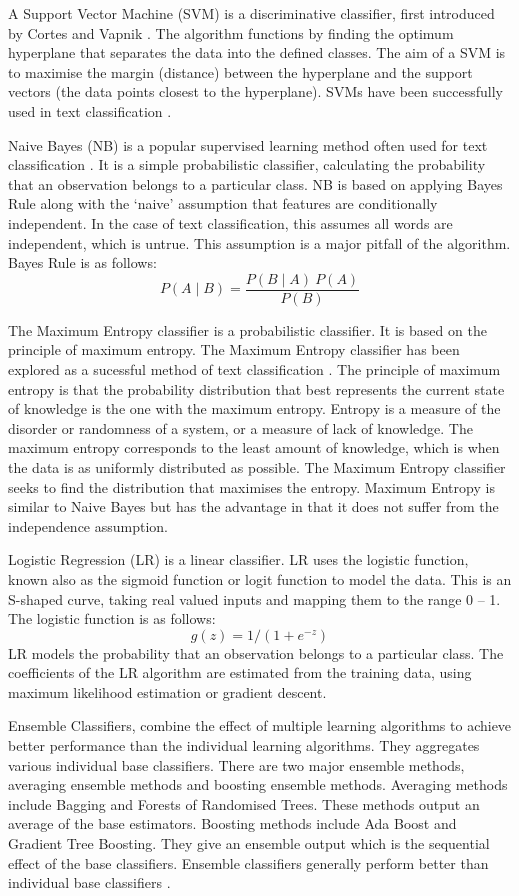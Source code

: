 A Support Vector Machine (SVM) is a discriminative classifier, first introduced by Cortes and Vapnik \cite{Vapnik1995,Vapnik21995}. The algorithm functions by finding the optimum hyperplane that separates the data into the defined classes. The aim of a SVM is to maximise the margin (distance) between the hyperplane and the support vectors (the data points closest to the hyperplane). SVMs have been successfully used in text classification \cite{Joachims1998}.

Naive Bayes (NB) is a popular supervised learning method often used for text classification \cite{NaiveBayes1998}. It is a simple probabilistic classifier, calculating the probability that an observation belongs to a particular class. NB is based on applying Bayes Rule along with the ‘naive’ assumption that features are conditionally independent. In the case of text classification, this assumes all words are independent, which is untrue. This assumption is a major pitfall of the algorithm. Bayes Rule is as follows:  \[P(A\mid B)=\frac{P(B\mid A)\:P(A)}{P(B)}\] 

The Maximum Entropy classifier is a probabilistic classifier. It is based on the principle of maximum entropy. The Maximum Entropy classifier has been explored as a sucessful method of text classification \cite{MaxEnt1999}. The principle of maximum entropy is that the probability distribution that best represents the current state of knowledge is the one with the maximum entropy. Entropy is a measure of the disorder or randomness of a system, or a measure of lack of knowledge. The maximum entropy corresponds to the least amount of knowledge, which is when the data is as uniformly distributed as possible. The Maximum Entropy classifier seeks to find the distribution that maximises the entropy. Maximum Entropy is similar to Naive Bayes but has the advantage in that it does not suffer from the independence assumption.

Logistic Regression (LR) is a linear classifier. LR uses the logistic function, known also as the sigmoid function or logit function to model the data. This is an S-shaped curve, taking real valued inputs and mapping them to the range 0 – 1. The logistic function is as follows: \[g(z)=1/(1+e^{-z})\]
LR models the probability that an observation belongs to a particular class. The coefficients of the LR algorithm are estimated from the training data, using maximum likelihood estimation or gradient descent.

Ensemble Classifiers, combine the effect of multiple learning algorithms to achieve better performance than the individual learning algorithms. They aggregates various individual base classifiers. There are two major ensemble methods, averaging ensemble methods and boosting ensemble methods. Averaging methods include Bagging and Forests of Randomised Trees. These methods output an average of the base estimators. Boosting methods include Ada Boost and Gradient Tree Boosting. They give an ensemble output which is the sequential effect of the base classifiers. Ensemble classifiers generally perform better than individual base classifiers \cite{Opitz1999}. 

